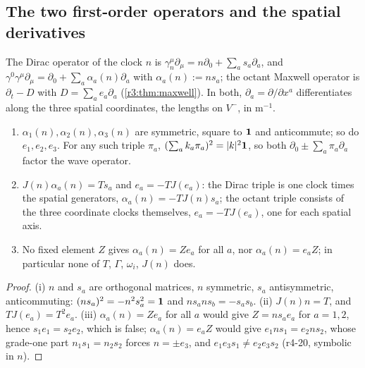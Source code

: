 \subsection{The two first-order operators and the spatial derivatives}
\label{r4:sec:operators}

The Dirac operator of the clock $n$ is $\gamma^\mu_n\partial_\mu=n\partial_0+\sum_as_a\partial_a$, and $\gamma^0\gamma^\mu\partial_\mu=\partial_0+\sum_a\alpha_a(n)\partial_a$ with
$\alpha_a(n):=ns_a$; the octant Maxwell operator is $\partial_t-D$ with $D=\sum_ae_a\partial_a$ (\cref{r3:thm:maxwell}). In both, $\partial_a=\partial/\partial x^a$ differentiates
along the three spatial coordinates, the lengths on $V^-$, in $\mathrm m^{-1}$.

\begin{proposition}
\label{r4:prop:triples}
\begin{enumerate}[label=(\roman*),leftmargin=2.2em]
\item $\alpha_1(n),\alpha_2(n),\alpha_3(n)$ are symmetric, square to $\mathbf 1$ and anticommute; so do $e_1,e_2,e_3$. For any such triple $\pi_a$,
$(\sum_ak_a\pi_a)^2=|k|^2\mathbf 1$, so both $\partial_0\pm\sum_a\pi_a\partial_a$ factor the wave operator.
\item $J(n)\alpha_a(n)=Ts_a$ and $e_a=-TJ(e_a)$: the Dirac triple is one clock times the spatial generators, $\alpha_a(n)=-TJ(n)s_a$; the octant triple consists of
the three coordinate clocks themselves, $e_a=-TJ(e_a)$, one for each spatial axis.
\item No fixed element $Z$ gives $\alpha_a(n)=Ze_a$ for all $a$, nor $\alpha_a(n)=e_aZ$; in particular none of $T$, $\Gamma$, $\omega_i$, $J(n)$ does.
\end{enumerate}
\end{proposition}

\begin{proof}
(i) $n$ and $s_a$ are orthogonal matrices, $n$ symmetric, $s_a$ antisymmetric, anticommuting: $(ns_a)^2=-n^2s_a^2=\mathbf 1$ and $ns_ans_b=-s_as_b$. (ii)
$J(n)n=T$, and $TJ(e_a)=T^2e_a$. (iii) $\alpha_a(n)=Ze_a$ for all $a$ would give $Z=ns_ae_a$ for $a=1,2$, hence $s_1e_1=s_2e_2$, which is false;
$\alpha_a(n)=e_aZ$ would give $e_1ns_1=e_2ns_2$, whose grade-one part $n_1s_1=n_2s_2$ forces $n=\pm e_3$, and $e_1e_3s_1\neq e_2e_3s_2$ (r4-20, symbolic
in $n$).
\end{proof}

